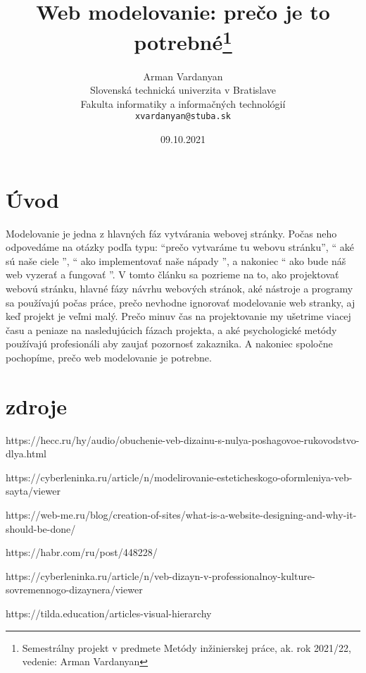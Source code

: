 \documentclass[10pt,twoside,slovak,a4paper]{article}
\title{Web modelovanie: prečo je to potrebné\thanks{Semestrálny projekt v predmete Metódy inžinierskej práce, ak. rok 2021/22, vedenie: Arman Vardanyan}} %
\author{Arman Vardanyan\\[2pt]
	{\small Slovenská technická univerzita v Bratislave}\\
	{\small Fakulta informatiky a informačných technológií}\\
	{\small \texttt{xvardanyan@stuba.sk}}
	}
\date{\small 09.10.2021} %
\begin{document}
\maketitle

\begin{center}
    
\end{center}

\section{Úvod}

Modelovanie je jedna z hlavných fáz vytvárania webovej stránky. Počas neho odpovedáme na otázky podľa typu: “prečo vytvaráme tu webovu stránku”, “ aké sú naše ciele ”, “ ako implementovať naše nápady ”, a nakoniec “ ako bude náš web vyzerať a fungovať ”. V tomto článku sa pozrieme na to, ako projektovať webovú stránku, hlavné fázy návrhu webových stránok, aké nástroje a programy sa používajú počas práce, prečo nevhodne ignorovať modelovanie web stranky, aj keď projekt je veľmi malý. Prečo minuv čas na projektovanie my ušetrime viacej času a peniaze na nasledujúcich fázach projekta, a aké psychologické metódy používajú profesionáli aby zaujať pozornosť zakaznika. A nakoniec spoločne pochopíme, prečo web modelovanie je potrebne.

\section{zdroje}

https://hecc.ru/hy/audio/obuchenie-veb-dizainu-s-nulya-poshagovoe-rukovodstvo-dlya.html

https://cyberleninka.ru/article/n/modelirovanie-esteticheskogo-oformleniya-veb-sayta/viewer

https://web-me.ru/blog/creation-of-sites/what-is-a-website-designing-and-why-it-should-be-done/

https://habr.com/ru/post/448228/

https://cyberleninka.ru/article/n/veb-dizayn-v-professionalnoy-kulture-sovremennogo-dizaynera/viewer

https://tilda.education/articles-visual-hierarchy
\end{document}
